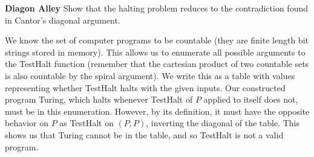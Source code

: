 \question \textbf{Diagon Alley}\newline
Show that the halting problem reduces to the contradiction found in Cantor's diagonal argument.
\begin{solution}
We know the set of computer programs to be countable (they are finite length bit strings stored in memory). This allows us to enumerate all possible arguments to the TestHalt function (remember that the cartesian product of two countable sets is also countable by the spiral argument). We write this as a table with values representing whether TestHalt halts with the given inputs. Our constructed program Turing, which halts whenever TestHalt of $P$ applied to itself does not, must be in this enumeration. However, by its definition, it must have the opposite behavior on $P$ as TestHalt on $(P, P)$, inverting the diagonal of the table. This shows us that Turing cannot be in the table, and so TestHalt is not a valid program.

\end{solution}